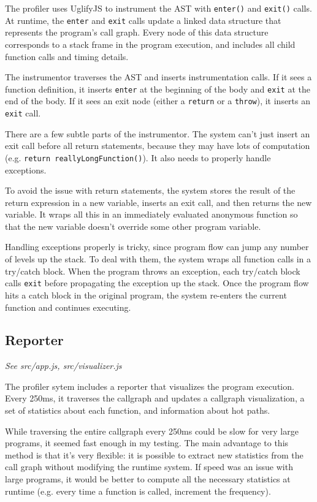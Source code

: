 \documentclass{article}
\begin{document}
The profiler uses UglifyJS \cite{uglify} to instrument the AST with \texttt{enter()} and \texttt{exit()} calls. At runtime, the \texttt{enter} and \texttt{exit} calls update a linked data structure that represents the program's call graph. Every node of this data structure corresponds to a stack frame in the program execution, and includes all child function calls and timing details.

The instrumentor traverses the AST and inserts instrumentation calls. If it sees a function definition, it inserts \texttt{enter} at the beginning of the body and \texttt{exit} at the end of the body. If it sees an exit node (either a \texttt{return} or a \texttt{throw}), it inserts an \texttt{exit} call.

There are a few subtle parts of the instrumentor. The system can't just insert an exit call before all return statements, because they may have lots of computation (e.g. \texttt{return reallyLongFunction()}). It also needs to properly handle exceptions.

To avoid the issue with return statements, the system stores the result of the return expression in a new variable, inserts an exit call, and then returns the new variable. It wraps all this in an immediately evaluated anonymous function so that the new variable doesn't override some other program variable.

Handling exceptions properly is tricky, since program flow can jump any number of levels up the stack. To deal with them, the system wraps all function calls in a try/catch block. When the program throws an exception, each try/catch block calls \texttt{exit} before propagating the exception up the stack. Once the program flow hits a catch block in the original program, the system re-enters the current function and continues executing.

\subsection*{Reporter}

\textit{See src/app.js, src/visualizer.js}

The profiler sytem includes a reporter that visualizes the program execution. Every 250ms, it traverses the callgraph and updates a callgraph visualization, a set of statistics about each function, and information about hot paths.

While traversing the entire callgraph every 250ms could be slow for very large programs, it seemed fast enough in my testing. The main advantage to this method is that it's very flexible: it is possible to extract new statistics from the call graph without modifying the runtime system. If speed was an issue with large programs, it would be better to compute all the necessary statistics at runtime (e.g. every time a function is called, increment the frequency). 
\end{document}
